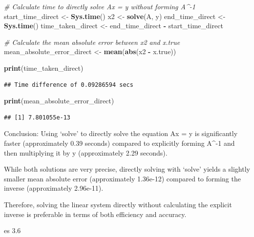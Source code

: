 \documentclass[
]{article}
\newenvironment{Shaded}{\begin{snugshade}}{\end{snugshade}}
\newcommand{\CommentTok}[1]{\textcolor[rgb]{0.56,0.35,0.01}{\textit{#1}}}
\newcommand{\FunctionTok}[1]{\textcolor[rgb]{0.13,0.29,0.53}{\textbf{#1}}}
\newcommand{\NormalTok}[1]{#1}
\newcommand{\OtherTok}[1]{\textcolor[rgb]{0.56,0.35,0.01}{#1}}
\newcommand{\SpecialCharTok}[1]{\textcolor[rgb]{0.81,0.36,0.00}{\textbf{#1}}}
\begin{document}
\begin{Shaded}
\begin{Highlighting}[]
\CommentTok{\# Calculate time to directly solve Ax = y without forming A\^{}{-}1}
\NormalTok{start\_time\_direct }\OtherTok{\textless{}{-}} \FunctionTok{Sys.time}\NormalTok{()}
\NormalTok{x2 }\OtherTok{\textless{}{-}} \FunctionTok{solve}\NormalTok{(A, y)}
\NormalTok{end\_time\_direct }\OtherTok{\textless{}{-}} \FunctionTok{Sys.time}\NormalTok{()}
\NormalTok{time\_taken\_direct }\OtherTok{\textless{}{-}}\NormalTok{ end\_time\_direct }\SpecialCharTok{{-}}\NormalTok{ start\_time\_direct}

\CommentTok{\# Calculate the mean absolute error between x2 and x.true}
\NormalTok{mean\_absolute\_error\_direct }\OtherTok{\textless{}{-}} \FunctionTok{mean}\NormalTok{(}\FunctionTok{abs}\NormalTok{(x2 }\SpecialCharTok{{-}}\NormalTok{ x.true))}

\FunctionTok{print}\NormalTok{(time\_taken\_direct)}
\end{Highlighting}
\end{Shaded}

\begin{verbatim}
## Time difference of 0.09286594 secs
\end{verbatim}

\begin{Shaded}
\begin{Highlighting}[]
\FunctionTok{print}\NormalTok{(mean\_absolute\_error\_direct)}
\end{Highlighting}
\end{Shaded}

\begin{verbatim}
## [1] 7.801055e-13
\end{verbatim}

Conclusion: Using `solve' to directly solve the equation Ax = y is
significantly faster (approximately 0.39 seconds) compared to explicitly
forming A\^{}-1 and then multiplying it by y (approximately 2.29
seconds).

While both solutions are very precise, directly solving with `solve'
yields a slightly smaller mean absolute error (approximately 1.36e-12)
compared to forming the inverse (approximately 2.96e-11).

Therefore, solving the linear system directly without calculating the
explicit inverse is preferable in terms of both efficiency and accuracy.

es 3.6
\end{document}
